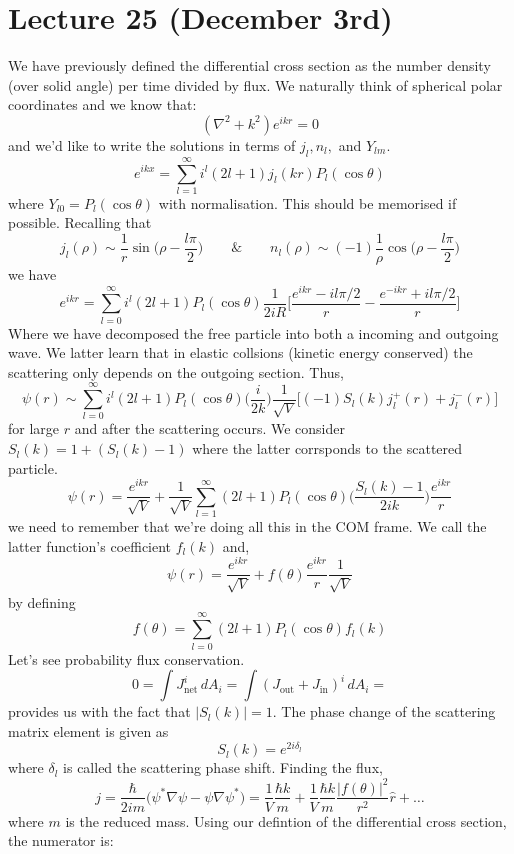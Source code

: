 \section{Lecture 25 (December 3rd)}
\begin{rmk}
We have previously defined the differential cross section as the number density (over solid angle) per time divided by flux. We naturally think of spherical polar coordinates and we know that:
\[(\nabla ^2+k^2)e^{ikr}=0\]
and we'd like to write the solutions in terms of $j_{l},n_{l},$ and $Y_{lm}$.
\[e^{ikx}=\sum _{l=1}^{\infty }i^{l}(2l+1)j_{l}(kr)P_{l}(\cos \theta )\]
where $Y_{l0}=P_{l}(\cos \theta )$ with normalisation. This should be memorised if possible. Recalling that
\[j_{l}(\rho )\sim \dfrac{1}{r}\sin \Big(\rho -\dfrac{l\pi }{2}\Big)\qquad\&\qquad n_{l}(\rho )\sim (-1)\dfrac{1}{\rho }\cos \Big(\rho -\dfrac{l\pi }{2}\Big)\]
we have
\[e^{ikr}=\sum _{l=0}^{\infty }i^{l}(2l+1)P_{l}(\cos \theta )\dfrac{1}{2iR}\Big[\dfrac{e^{ikr}-il\pi /2}{r}-\dfrac{e^{-ikr}+il\pi /2}{r}\Big]\]
Where we have decomposed the free particle into both a incoming and outgoing wave. We latter learn that in elastic collsions (kinetic energy conserved) the scattering only depends on the outgoing section. Thus,
\[\psi (r)\sim\sum ^{\infty }_{l=0}i^{l}(2l+1)P_{l}(\cos \theta )\Big(\dfrac{i}{2k}\Big)\dfrac{1}{\sqrt{V}}\Big[(-1)S_{l}(k)j_{l}^{+}(r)+j_{l}^{-}(r)\Big]\]
for large $r$ and after the scattering occurs. We consider $S_{l}(k)=1+(S_{l}(k)-1)$ where the latter corrsponds to the scattered particle.
\[\psi (r)=\dfrac{e^{ikr}}{\sqrt{V}}+\dfrac{1}{\sqrt{V}}\sum ^{\infty }_{l=1}(2l+1)P_{l}(\cos \theta )\Big(\dfrac{S_{l}(k)-1}{2ik}\Big)\dfrac{e^{ikr}}{r}\]
we need to remember that we're doing all this in the COM frame. We call the latter function's coefficient $f_{l}(k)$ and,
\[\psi (r)=\dfrac{e^{ikr}}{\sqrt{V}}+f(\theta )\dfrac{e^{ikr}}{r}\dfrac{1}{\sqrt{V}}\]
by defining
\[f(\theta )=\sum ^{\infty }_{l=0}(2l+1)P_{l}(\cos \theta )f_{l}(k)\]
Let's see probability flux conservation.
\[0=\int J_{\mathrm{net}}^{i} \,dA_{i}=\int (J_{\mathrm{out}}+J_{\mathrm{in}})^{i}\, dA_{i}=\]
provides us with the fact that $|S_{l}(k)|=1$. The phase change of the scattering matrix element is given as
\[S_{l}(k)=e^{2i\delta _{l}}\]
where $\delta _{l}$ is called the scattering phase shift. Finding the flux,
\[j=\dfrac{\hbar }{2im}\Big(\psi ^{*}\nabla \psi -\psi \nabla \psi ^{*}\Big)=\dfrac{1}{V}\dfrac{\hbar k}{m}+\dfrac{1}{V}\dfrac{\hbar k}{m}\dfrac{|f(\theta )|^2}{r^2}\hat{r}+\ldots \]
where $m$ is the reduced mass. Using our defintion of the differential cross section, the numerator is:

\end{rmk}
